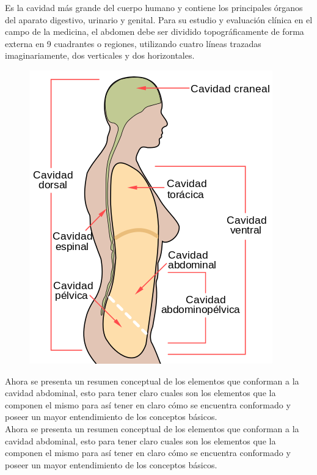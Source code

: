 Es la cavidad más grande del cuerpo humano y contiene los principales órganos del aparato digestivo, urinario y genital.
Para su estudio y evaluación clínica en el campo de la medicina, el abdomen debe ser dividido topográficamente de forma externa en 9 
cuadrantes o regiones, utilizando cuatro líneas trazadas imaginariamente, dos verticales y dos horizontales.\cite{web12}
\begin{figure}[H]
	\begin{center}
 		\includegraphics[width = .3\textwidth]{source/images/image56.png}
	\end{center} 
\end{figure}
Ahora se presenta un resumen conceptual de los elementos que conforman a la cavidad abdominal, esto para tener claro cuales son los elementos 
que la componen el mismo para así tener en claro cómo se encuentra conformado y poseer un mayor entendimiento de los conceptos básicos.\\
Ahora se presenta un resumen conceptual de los elementos que conforman a la cavidad abdominal, esto para tener claro cuales son los elementos 
que la componen el mismo para así tener en claro cómo se encuentra conformado y poseer un mayor entendimiento de los conceptos básicos.\\
